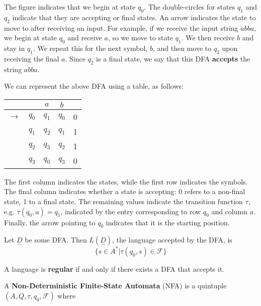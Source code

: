The figure indicates that we begin at state $q_0$. The double-circles for states $q_1$ and $q_2$ indicate that they are accepting or final states. An arrow indicates the state to move to after receiving an input. For example, if we receive the input string $abba$, we begin at state $q_0$ and receive $a$, so we move to state $q_1$. We then receive $b$ and stay in $q_1$. We repeat this for the next symbol, $b$, and then move to $q_2$ upon receiving the final $a$. Since $q_2$ is a final state, we say that this DFA \textbf{accepts} the string $abba$. 

We can represent the above DFA using a table, as follows:

\begin{center}\begin{tabular}{c c|c c r}
         & & $a$ & $b$ & \\\hline
    $\to$ & $q_0$ & $q_1$ & $q_0$ & 0 \\
    & $q_1$ & $q_2$ & $q_1$ & 1 \\
    & $q_2$ & $q_3$ & $q_2$ & 1\\
    & $q_3$ & $q_0$ & $q_3$ & 0\\
\end{tabular}\end{center}

The first column indicates the states, while the first row indicates the symbols. The final column indicates whether a state is accepting: 0 refers to a non-final state, 1 to a final state. The remaining values indicate the transition function $\tau$, e.g. $\tau(q_0, a)=q_1$, indicated by the entry corresponding to row $q_0$ and column $a$. Finally, the arrow pointing to $q_0$ indicates that it is the starting position. 

\begin{definition}
Let $\underset{\sim}{D}$ be some DFA. Then $L(\underset{\sim}{D})$, the language accepted by the DFA, is \[\{s\in A^*|\tau(q_0, s)\in \mathcal{F}\}\]
\end{definition}

\begin{definition}
A language is \textbf{regular} if and only if there exists a DFA that accepts it.
\end{definition}

\begin{definition}
A \textbf{Non-Deterministic Finite-State Automata} (NFA) is a quintuple $(A, Q, \tau, q_0, \mathcal{F})$ where 
\end{definition}

